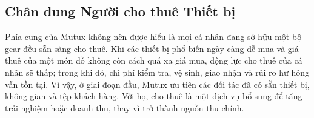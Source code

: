 
\subsection{Chân dung Người cho thuê Thiết bị}

Phía cung của Mutux không nên được hiểu là mọi cá nhân đang sở hữu một bộ gear đều sẵn sàng cho thuê. Khi các thiết bị phổ biến ngày càng dễ mua và giá thuê của một món đồ không còn cách quá xa giá mua, động lực cho thuê của cá nhân sẽ thấp; trong khi đó, chi phí kiểm tra, vệ sinh, giao nhận và rủi ro hư hỏng vẫn tồn tại. Vì vậy, ở giai đoạn đầu, Mutux ưu tiên các đối tác đã có sẵn thiết bị, không gian và tệp khách hàng. Với họ, cho thuê là một dịch vụ bổ sung để tăng trải nghiệm hoặc doanh thu, thay vì trở thành nguồn thu chính.

